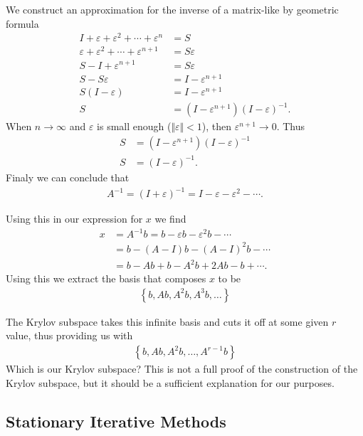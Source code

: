 \documentclass[../fem.tex]{subfiles}
\begin{document}
We construct an approximation for the inverse of a matrix-like by geometric
formula
\begin{align*}
  I+\varepsilon+\varepsilon^2+\cdots+\varepsilon^n&=S\\
  \varepsilon+\varepsilon^2+\cdots+\varepsilon^{n+1}&=S\varepsilon\\
  S-I+\varepsilon^{n+1}&=S\varepsilon\\
  S-S\varepsilon&=I-\varepsilon^{n+1}\\
  S(I-\varepsilon)&=I-\varepsilon^{n+1}\\
  S&=\left(I-\varepsilon^{n+1}\right)\left(I-\varepsilon\right)^{-1}.
\end{align*}
When $n\rightarrow \infty$ and $\varepsilon$ is small enough
($\Vert\varepsilon\Vert < 1$), then $\varepsilon^{n+1}\rightarrow 0$. Thus
\begin{align*}
  S&=\left(I-\varepsilon^{n+1}\right)\left(I-\varepsilon\right)^{-1}\\
  S&=\left(I-\varepsilon\right)^{-1}.
\end{align*}
Finaly we can conclude that
\begin{align*}
  A^{-1}=(I+\varepsilon)^{-1}=I-\varepsilon-\varepsilon^2-\cdots.
\end{align*}

Using this in our expression for $x$ we find
\begin{align*}
  x&=A^{-1}b=b-\varepsilon b-\varepsilon^2 b - \cdots\\
   &=b-(A-I)b-(A-I)^2b-\cdots\\
   &=b-Ab+b-A^2b+2Ab-b+\cdots.
\end{align*}
Using this we extract the basis that composes $x$ to be
\begin{align*}
  \left\{b, Ab, A^2b, A^3b, \ldots\right\}
\end{align*}

The Krylov subspace takes this infinite basis and cuts it off at some given
$r$ value, thus providing us with
\begin{align*}
  \left\{b,Ab,A^2b,\ldots,A^{r-1}b\right\}
\end{align*}
Which is our Krylov subspace? This is not a full proof of the construction of
the Krylov subspace, but it should be a sufficient explanation for our purposes.

\subsection{Stationary Iterative Methods}%
\label{sub:stationary_iterative_methods}
\end{document}
